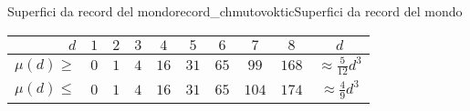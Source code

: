 \begin{surferIntroPage}{Superfici da record del mondo}{record_chmutovoktic}{Superfici da record del mondo}
   \begin{center}
      \begin{tabular}{r|cccccccc|c}
        $d$ & $1$ & $2$ & $3$ & $4$ & $5$ & $6$ & $7$ & $8$ & $d$\\
        \hline
        \hline
        \rule{0pt}{1.2em}$\mu(d)\ge$ & $0$ & $1$ & $4$ & $16$ & $31$ & $65$ &
        $99$ & $168$ & 
        $\approx \frac{5}{12}d^3$\\[0.3em]
        \hline
        \rule{0pt}{1.2em}$\mu(d)\le$ & $0$ & $1$ & $4$ & $16$ & $31$ & $65$ &
        $104$ & $174$ & $\approx \frac{4}{9}d^3$
      \end{tabular}
    \end{center}
\end{surferIntroPage}
